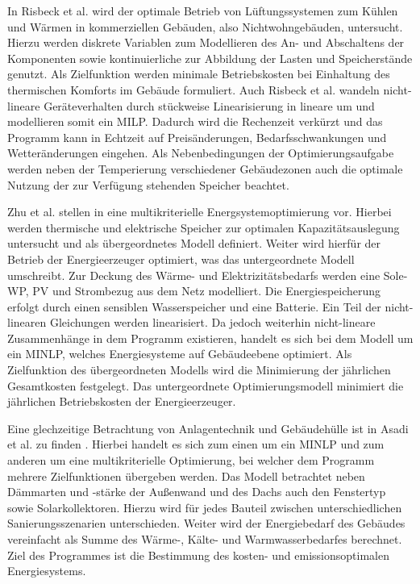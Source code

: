 In Risbeck et al. \cite{Risbeck.2017} wird der optimale Betrieb von Lüftungssystemen zum Kühlen und Wärmen in kommerziellen Gebäuden, also Nichtwohngebäuden, untersucht.
Hierzu werden diskrete Variablen zum Modellieren des An- und Abschaltens der Komponenten sowie kontinuierliche zur Abbildung der Lasten und Speicherstände genutzt.
Als Zielfunktion werden minimale Betriebskosten bei Einhaltung des thermischen Komforts im Gebäude formuliert.
Auch Risbeck et al. wandeln nicht-lineare Geräteverhalten durch stückweise Linearisierung in lineare um und modellieren somit ein MILP.
Dadurch wird die Rechenzeit verkürzt und das Programm kann in Echtzeit auf Preisänderungen, Bedarfsschwankungen und Wetteränderungen eingehen.
Als Nebenbedingungen der Optimierungsaufgabe werden neben der Temperierung verschiedener Gebäudezonen auch die optimale Nutzung der zur Verfügung stehenden Speicher beachtet.

Zhu et al. stellen in \cite{Zhu.2019} eine multikriterielle Energsystemoptimierung vor.
Hierbei werden thermische und elektrische Speicher zur optimalen Kapazitätsauslegung untersucht und als übergeordnetes Modell definiert.
Weiter wird hierfür der Betrieb der Energieerzeuger optimiert, was das untergeordnete Modell umschreibt.
Zur Deckung des Wärme- und Elektrizitätsbedarfs werden eine Sole-WP, PV und Strombezug aus dem Netz modelliert.
Die Energiespeicherung erfolgt durch einen sensiblen Wasserspeicher und eine Batterie.
Ein Teil der nicht-linearen Gleichungen werden linearisiert. 
Da jedoch weiterhin nicht-lineare Zusammenhänge in dem Programm existieren, handelt es sich bei dem Modell um ein MINLP, welches Energiesysteme auf Gebäudeebene optimiert.
Als Zielfunktion des übergeordneten Modells wird die Minimierung der jährlichen Gesamtkosten festgelegt.
Das untergeordnete Optimierungsmodell minimiert die jährlichen Betriebskosten der Energieerzeuger.

Eine glechzeitige Betrachtung von Anlagentechnik und Gebäudehülle ist in Asadi et al. zu finden \cite{Asadi.2012}.
Hierbei handelt es sich zum einen um ein MINLP und zum anderen um eine multikriterielle Optimierung, bei welcher dem Programm mehrere Zielfunktionen übergeben werden.
Das Modell betrachtet neben Dämmarten und -stärke der Außenwand und des Dachs auch den Fenstertyp sowie Solarkollektoren. 
Hierzu wird für jedes Bauteil zwischen unterschiedlichen Sanierungsszenarien unterschieden.
Weiter wird der Energiebedarf des Gebäudes vereinfacht als Summe des Wärme-, Kälte- und Warmwasserbedarfes berechnet.
Ziel des Programmes ist die Bestimmung des kosten- und emissionsoptimalen Energiesystems.


